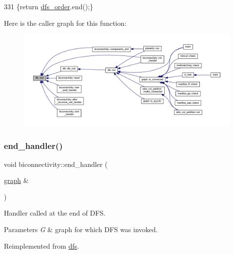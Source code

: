 \begin{DoxyCode}
331     \{\textcolor{keywordflow}{return} \mbox{\hyperlink{classdfs_af70a73ace68afd91ef944f984c9f28d5}{dfs\_order}}.end();\}
\end{DoxyCode}
Here is the caller graph for this function\+:
\nopagebreak
\begin{figure}[H]
\begin{center}
\leavevmode
\includegraphics[width=350pt]{classdfs_af847633fa642258d3522e8deb26aef37_icgraph}
\end{center}
\end{figure}
\mbox{\label{classbiconnectivity_a2583331a4561f3db221ab674d2e5d75e}} 
\subsubsection{\texorpdfstring{end\+\_\+handler()}{end\_handler()}}
{\footnotesize\ttfamily void biconnectivity\+::end\+\_\+handler (\begin{DoxyParamCaption}\item[{\mbox{\hyperlink{classgraph}{graph}} \&}]{ }\end{DoxyParamCaption})\hspace{0.3cm}{\ttfamily [virtual]}}



Handler called at the end of D\+FS. 


\begin{DoxyParams}{Parameters}
{\em G} & graph for which D\+FS was invoked. \\
\hline
\end{DoxyParams}


Reimplemented from \mbox{\hyperlink{classdfs_a59c512fa99ad3809db3e24347ab43b85}{dfs}}.



